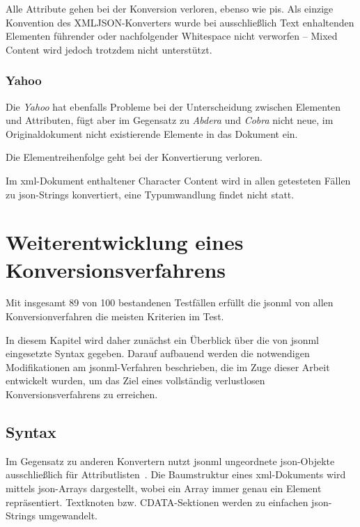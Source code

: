 Alle Attribute gehen bei der Konversion verloren, ebenso wie \glspl{pi}. Als einzige Konvention des XMLJSON-Konverters wurde bei ausschließlich Text enhaltenden Elementen führender oder nachfolgender Whitespace nicht verworfen -- Mixed Content wird jedoch trotzdem nicht unterstützt.

\subsection{Yahoo}
\label{sec:xmljson-yahoo}

Die \emph{Yahoo} hat ebenfalls Probleme bei der Unterscheidung zwischen Elementen und Attributen, fügt aber im Gegensatz zu \emph{Abdera} und \emph{Cobra} nicht neue, im Originaldokument nicht existierende Elemente in das Dokument ein.

Die Elementreihenfolge geht bei der Konvertierung verloren.

Im \acrshort{xml}-Dokument enthaltener Character Content wird in allen getesteten Fällen zu \acrshort{json}-Strings konvertiert, eine Typumwandlung findet nicht statt.

\chapter{Weiterentwicklung eines Konversionsverfahrens}
\label{chap:jsonml}

Mit insgesamt 89 von 100 bestandenen Testfällen erfüllt die \acrfull{jsonml} von allen Konversionverfahren die meisten Kriterien im Test.

In diesem Kapitel wird daher zunächst ein Überblick über die von \acrshort{jsonml} eingesetzte Syntax gegeben.
Darauf aufbauend werden die notwendigen Modifikationen am \acrshort{jsonml}-Verfahren beschrieben, die im Zuge dieser Arbeit entwickelt wurden, um das Ziel eines vollständig verlustlosen Konversionsverfahrens zu erreichen.

\section{Syntax}
\label{sec:jsonml-syntax}

Im Gegensatz zu anderen Konvertern nutzt \acrshort{jsonml} ungeordnete \acrshort{json}-Objekte ausschließlich für Attributlisten~\cite{jsonmlsyntax}. Die Baumstruktur eines \acrshort{xml}-Dokuments wird mittels \acrshort{json}-Arrays dargestellt, wobei ein Array immer genau ein Element repräsentiert. Textknoten bzw. CDATA-Sektionen werden zu einfachen \acrshort{json}-Strings umgewandelt.

